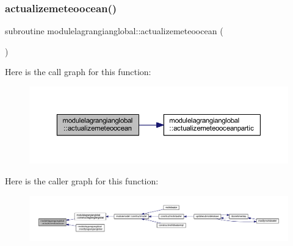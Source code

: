 \subsubsection{\texorpdfstring{actualizemeteoocean()}{actualizemeteoocean()}}
{\footnotesize\ttfamily subroutine modulelagrangianglobal\+::actualizemeteoocean (\begin{DoxyParamCaption}{ }\end{DoxyParamCaption})\hspace{0.3cm}{\ttfamily [private]}}

Here is the call graph for this function\+:\nopagebreak
\begin{figure}[H]
\begin{center}
\leavevmode
\includegraphics[width=350pt]{namespacemodulelagrangianglobal_a0fa07eb74ec148c5c6faeec4cd4561c9_cgraph}
\end{center}
\end{figure}
Here is the caller graph for this function\+:\nopagebreak
\begin{figure}[H]
\begin{center}
\leavevmode
\includegraphics[width=350pt]{namespacemodulelagrangianglobal_a0fa07eb74ec148c5c6faeec4cd4561c9_icgraph}
\end{center}
\end{figure}
\mbox{\label{namespacemodulelagrangianglobal_ae28614950d33d82496f705c7601b8d28}} 
